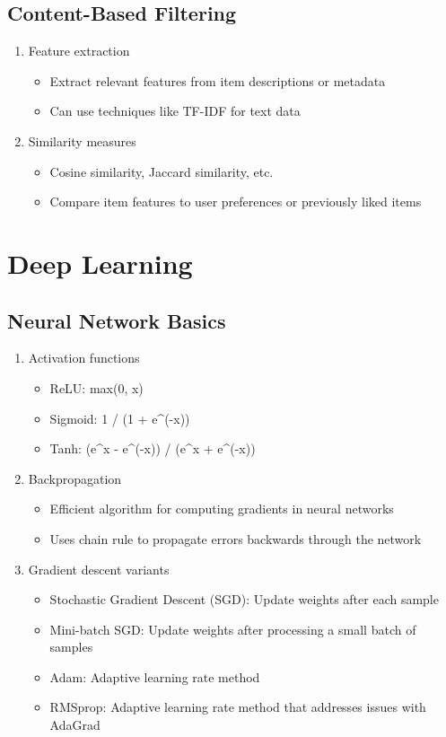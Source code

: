 \documentclass{article}
\begin{document}
\subsection{Content-Based Filtering}
\begin{enumerate}
    \item Feature extraction
    \begin{itemize}
        \item Extract relevant features from item descriptions or metadata
        \item Can use techniques like TF-IDF for text data
    \end{itemize}
    
    \item Similarity measures
    \begin{itemize}
        \item Cosine similarity, Jaccard similarity, etc.
        \item Compare item features to user preferences or previously liked items
    \end{itemize}
\end{enumerate}

\section{Deep Learning}

\subsection{Neural Network Basics}
\begin{enumerate}
    \item Activation functions
    \begin{itemize}
        \item ReLU: max(0, x)
        \item Sigmoid: 1 / (1 + e^(-x))
        \item Tanh: (e^x - e^(-x)) / (e^x + e^(-x))
    \end{itemize}
    
    \item Backpropagation
    \begin{itemize}
        \item Efficient algorithm for computing gradients in neural networks
        \item Uses chain rule to propagate errors backwards through the network
    \end{itemize}
    
    \item Gradient descent variants
    \begin{itemize}
        \item Stochastic Gradient Descent (SGD): Update weights after each sample
        \item Mini-batch SGD: Update weights after processing a small batch of samples
        \item Adam: Adaptive learning rate method
        \item RMSprop: Adaptive learning rate method that addresses issues with AdaGrad
    \end{itemize}
\end{enumerate}
\end{document}
